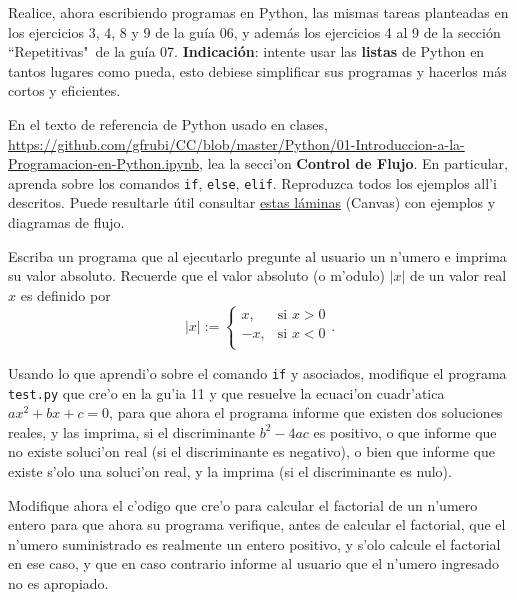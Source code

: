 \documentclass[11pt]{exam}
\begin{document}
\begin{questions}
\item Realice, ahora escribiendo programas en Python, las mismas tareas planteadas en los ejercicios 3, 4, 8 y 9 de la guía 06, y además los ejercicios 4 al 9 de la sección ``Repetitivas"\, de la guía 07. \textbf{Indicación}: intente usar las \textbf{listas} de Python en tantos lugares como pueda, esto debiese simplificar sus programas y hacerlos más cortos y eficientes.

\item En el texto de referencia de Python usado en clases, \url{https://github.com/gfrubi/CC/blob/master/Python/01-Introduccion-a-la-Programacion-en-Python.ipynb}, lea la secci'on \textbf{Control de Flujo}. En particular, aprenda sobre los comandos \texttt{if}, \texttt{else}, \texttt{elif}.  Reproduzca todos los ejemplos all'i descritos. Puede resultarle útil consultar \href{https://udec.instructure.com/courses/684/files/folder/Python?preview=557597}{estas láminas} (Canvas) con ejemplos y diagramas de flujo.

\item Escriba un programa que al ejecutarlo pregunte al usuario un n'umero e imprima su valor absoluto. Recuerde que el valor absoluto (o m'odulo) $|x|$ de un valor real $x$ es definido por
\begin{equation}
|x|:=\left\{\begin{array}{cl}
x, &\text{si } x>0 \\
-x, & \text{si } x<0 \\
\end{array}\right. .
\end{equation}

\item Usando lo que aprendi'o sobre el comando \texttt{if} y asociados, modifique el programa \texttt{test.py} que cre'o en la gu'ia 11 y que resuelve la ecuaci'on cuadr'atica $ax^2+bx+c=0$, para que ahora el programa informe que existen dos soluciones reales, y las imprima, si el discriminante $b^2-4ac$ es positivo, o que informe que no existe soluci'on real (si el discriminante es negativo), o bien que informe que existe s'olo una soluci'on real, y la imprima (si el discriminante es nulo).

\item Modifique ahora el c'odigo que cre'o para calcular el factorial de un n'umero entero para que ahora su programa verifique, antes de calcular el factorial, que el n'umero suministrado es realmente un entero positivo, y s'olo calcule el factorial en ese caso, y que en caso contrario informe al usuario que el n'umero ingresado no es apropiado.


\end{questions}
\end{document}
